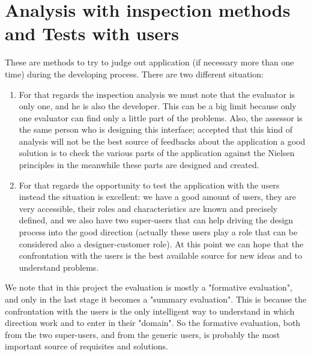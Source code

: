 \section{Analysis with inspection methods and Tests with users}
These are methods to try to judge out application (if necessary more than one time) during the developing process. There are two different situation:

\begin{enumerate}

\item For that regards the inspection analysis we must note that the evaluator is only one, and he is also the developer. This can be a big limit because only one evaluator can find only a little part of the problems. Also, the assessor is the same person who is designing this interface; accepted that this kind of analysis will not be the best source of feedbacks about the application a good solution is to check the various parts of the application against the Nielsen principles in the meanwhile these parts are designed and created.

\item For that regards the opportunity to test the application with the users instead the situation is excellent: we have a good amount of users, they are very accessible, their roles and characteristics are known and precisely defined, and we also have two super-users that can help driving the design process into the good direction (actually these users play a role that can be considered also a designer-customer role). At this point we can hope that the confrontation with the users is the best available source for new ideas and to understand problems.    

\end{enumerate}

We note that in this project the evaluation is mostly a "formative evaluation", and only in the last stage it becomes a "summary evaluation". This is because the confrontation with the users is the only intelligent way to understand in which direction work and to enter in their "domain". So the formative evaluation, both from the two super-users, and from the generic users, is probably the most important source of requisites and solutions.   

